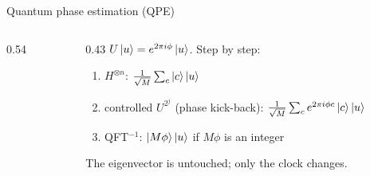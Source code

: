 \documentclass[aspectratio=169,11pt]{beamer}
\begin{document}
\begin{frame}{Quantum phase estimation (QPE)}
  \begin{columns}[T]
    \begin{column}{0.54\textwidth}
      \centering
    \end{column}
    \begin{column}{0.43\textwidth}
      \small $U\ket u = e^{2\pi i\phi}\ket u$. Step by step:
      \begin{enumerate}
        \item $H^{\otimes n}$: $\frac{1}{\sqrt M}\sum_c\ket c\ket u$
        \item controlled $U^{2^j}$ (phase kick-back): $\frac{1}{\sqrt M}\sum_ce^{2\pi i\phi c}\ket c\ket u$
        \item QFT$^{-1}$: $\ket{M\phi}\ket u$ if $M\phi$ is an integer
      \end{enumerate}
      The eigenvector is untouched; only the clock changes.
    \end{column}
  \end{columns}
\end{frame}
\end{document}
